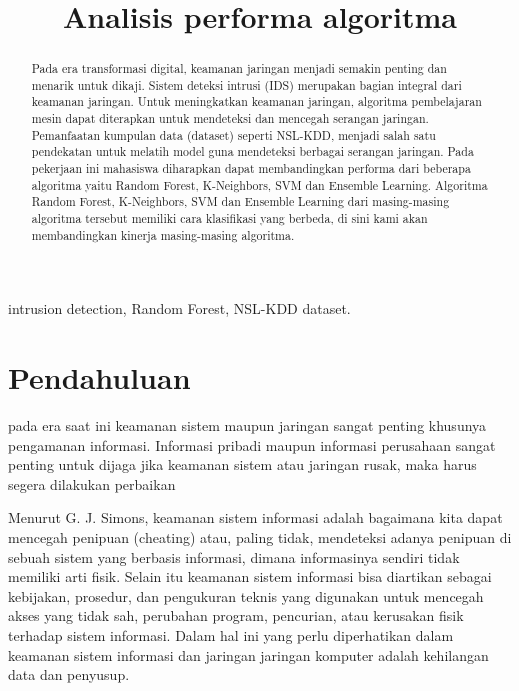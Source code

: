 \documentclass[conference]{IEEEtran}
\begin{document}
\title{Analisis performa algoritma}

\author{
}

\maketitle
\begin{abstract}
Pada era transformasi digital, keamanan jaringan menjadi semakin penting dan menarik untuk dikaji. Sistem deteksi intrusi (IDS) merupakan bagian integral dari keamanan jaringan. Untuk meningkatkan keamanan jaringan, algoritma pembelajaran mesin dapat diterapkan untuk mendeteksi dan mencegah serangan jaringan. Pemanfaatan kumpulan data (dataset) seperti NSL-KDD, menjadi salah satu pendekatan untuk melatih model guna mendeteksi berbagai serangan jaringan. Pada pekerjaan ini mahasiswa diharapkan dapat membandingkan performa dari beberapa algoritma yaitu Random Forest, K-Neighbors, SVM dan Ensemble Learning. Algoritma Random Forest, K-Neighbors, SVM dan Ensemble Learning dari masing-masing algoritma tersebut memiliki cara klasifikasi yang berbeda, di sini kami akan membandingkan kinerja masing-masing algoritma.
\end{abstract}

\begin{IEEEkeywords}
intrusion detection, Random Forest, NSL-KDD dataset.
\end{IEEEkeywords}


\section{Pendahuluan}
pada era saat ini keamanan sistem maupun jaringan sangat penting khusunya pengamanan informasi. Informasi pribadi maupun informasi perusahaan sangat penting untuk dijaga jika keamanan sistem atau jaringan rusak, maka harus segera dilakukan perbaikan

Menurut G. J. Simons, keamanan sistem informasi adalah bagaimana kita dapat mencegah penipuan (cheating) atau, paling tidak, mendeteksi adanya penipuan di sebuah sistem yang berbasis informasi, dimana informasinya sendiri tidak memiliki arti fisik. Selain itu keamanan sistem informasi bisa diartikan sebagai kebijakan, prosedur, dan pengukuran teknis yang digunakan untuk mencegah akses yang tidak sah, perubahan program, pencurian, atau kerusakan fisik terhadap sistem informasi. Dalam hal ini yang perlu diperhatikan dalam keamanan sistem informasi dan jaringan jaringan komputer adalah kehilangan data dan penyusup.
\end{document}
